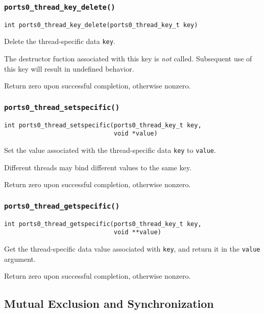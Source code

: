 \subsubsection{\tt ports0\_thread\_key\_delete()}
\begin{verbatim}
int ports0_thread_key_delete(ports0_thread_key_t key)
\end{verbatim}

Delete the thread-specific data {\tt key}. 

The destructor fuction associated with this key is {\em not} called.
Subsequent use of this key will result in undefined behavior.

Return zero upon successful completion, otherwise nonzero.


\subsubsection{\tt ports0\_thread\_setspecific()}
\begin{verbatim}
int ports0_thread_setspecific(ports0_thread_key_t key,
                              void *value)
\end{verbatim}

Set the value associated with the thread-specific data {\tt key} to
{\tt value}. 

Different threads may bind different values to the same key.

Return zero upon successful completion, otherwise nonzero.


\subsubsection{\tt ports0\_thread\_getspecific()}
\begin{verbatim}
int ports0_thread_getspecific(ports0_thread_key_t key,
                              void **value)
\end{verbatim}

Get the thread-specific data value associated with {\tt key}, and
return it in the {\tt value} argument.

Return zero upon successful completion, otherwise nonzero.


\subsection{Mutual Exclusion and Synchronization}

